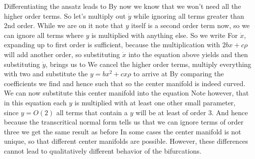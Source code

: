 \solution
Differentiating the ansatz leads to 
By now we know that we won't need all the higher order terms. So let's multiply out $\dot{y}$ while ignoring all terms greater than 2nd order. While we are on it note that $y$ itself is a second order term now, so we can ignore all terms where $y$ is multiplied with anything else. So we write  
For $\dot{x}$, expanding up to first order is sufficient, because the multiplication with $2bx+c\rho$ will add another order, so 
substituting $\dot{x}$ into the equation above yields
and then substituting $\dot{y}$, brings us to 
We cancel the higher order terms, multiply everything with two and substitute the $y=bx^2+cx\rho$ to arrive at  
By comparing the coefficients we find 
and hence 
such that 
so the center manifold is indeed curved. We can now substitute this center manifold into the equation
Note however, that in this equation each $y$ is multiplied with at least one other small parameter, since $y=O(2)$ all terms that contain a $y$ will be at least of order 3. And hence 
because the transcritical normal form tells us that we can ignore terms of order three we get the same result as before
In some cases the center manifold is not unique, so that different center manifolds are possible. However, these differences cannot lead to qualitatively different behavior of the bifurcations.